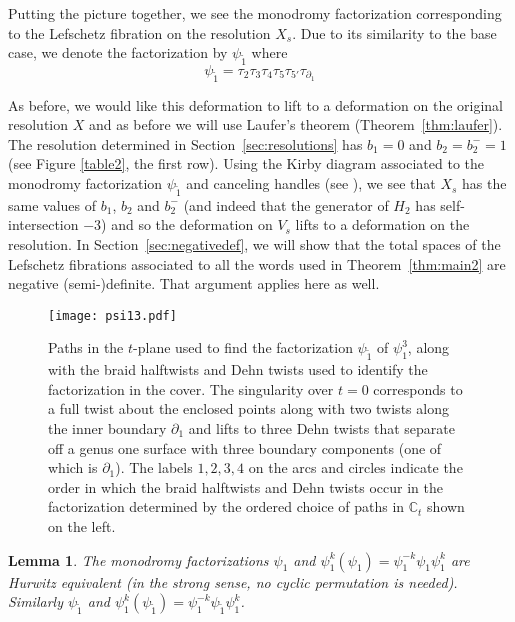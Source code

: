 \documentclass[11pt,letterpaper,reqno]{amsart}
\newtheorem{lemma}[theorem]{Lemma}
\theoremstyle{remark}
\newcommand{\CC}{{\mathbb C}}
\begin{document}
Putting the picture together, we see the monodromy factorization corresponding to the Lefschetz fibration on the resolution $X_s$. Due to its similarity to the base case, we denote the factorization by $\psi_{\tilde{1}}$ where
 \[\psi_{\tilde{1}} = \tau_2 \tau_3 \tau_4 \tau_5 \tau_{5'} \tau_{\partial_1}\]

As before, we would like this deformation to lift to a deformation on the original resolution $X$ and as before we will use Laufer's theorem (Theorem~\ref{thm:laufer}). The resolution determined in Section~\ref{sec:resolutions} has $b_1 = 0$ and $b_2 = b_2^- = 1$ (see Figure \ref{table2}, the first row). Using the Kirby diagram associated to the monodromy factorization $\psi_{\tilde{1}}$ and canceling handles (see \cite{GS}), we see that $X_s$ has the same values of $b_1$, $b_2$ and $b_2^{-}$ (and indeed that the generator of $H_2$ has self-intersection $-3$) and so the deformation on $V_s$ lifts to a deformation on the resolution. In Section~\ref{sec:negativedef}, we will show that the total spaces of the Lefschetz fibrations associated to all the words used in Theorem~\ref{thm:main2} are negative (semi-)definite. That argument applies here as well.

\begin{figure}
    \centering
    \texttt{[image: psi13.pdf]}
    \caption{Paths in the $t$-plane used to find the factorization $\psi_{\tilde{1}}$ of $\psi_1^3$, along with the braid halftwists and Dehn twists used to identify the factorization in the cover. The singularity over $t=0$ corresponds to a full twist about the enclosed points along with two twists along the inner boundary $\partial_1$ and lifts to three Dehn twists that separate off a genus one surface with three boundary components (one of which is $\partial_1$). The labels $1, 2, 3, 4$ on the arcs and circles indicate the order in which the braid halftwists and Dehn twists occur in the factorization determined by the ordered choice of paths in $\CC_t$ shown on the left.}
    \label{fig:psi13}
\end{figure}

\begin{lemma} \label{lem:hurwitz} The monodromy factorizations $\psi_1$ and $\psi_1^k(\psi_1)= \psi_1^{-k} \psi_1 \psi_1^k$ are Hurwitz equivalent (in the strong sense, no cyclic permutation is needed). Similarly $\psi_{\tilde{1}}$ and $\psi_1^k(\psi_{\tilde{1}})= \psi_1^{-k} \psi_{\tilde{1}} \psi_1^k$.
\end{lemma}
\end{document}
